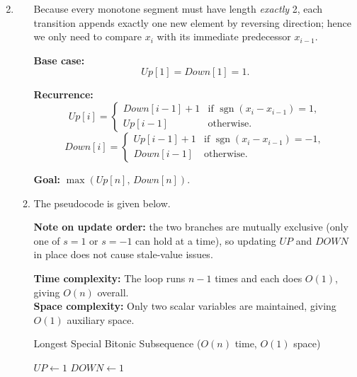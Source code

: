 \documentclass[12pt,a4paper]{article}
\makeatletter
\newtheorem*{solution}{Solution}
\theoremstyle{definition}
\renewenvironment{solution}[1][Solution] {\par\pushQED{\qed}\normalfont\topsep6\p@\@plus6\p@\relax\trivlist\item[\hskip\labelsep\bfseries#1\@addpunct{.}]\ignorespaces}{\popQED\endtrivlist\@endpefalse} \makeatother
\makeatother
\begin{document}
\begin{enumerate}
\begin{solution}
\begin{enumerate}
        Because every monotone segment must have length \emph{exactly}
        2, each transition appends exactly one new element by reversing
        direction; hence we only need to compare $x_i$ with its
        immediate predecessor $x_{i-1}$.

        \textbf{Base case:}
        \[
            Up[1] = Down[1] = 1.
        \]

        \textbf{Recurrence:}
        \[
            Up[i] =
            \begin{cases}
                Down[i-1] + 1 & \text{if } \operatorname{sgn}(x_i - x_{i-1}) = 1, \\
                Up[i-1]       & \text{otherwise.}
            \end{cases}
        \]
        \[
            Down[i] =
            \begin{cases}
                Up[i-1] + 1 & \text{if } \operatorname{sgn}(x_i - x_{i-1}) = -1, \\
                Down[i-1]   & \text{otherwise.}
            \end{cases}
        \]

        \textbf{Goal:} $\max(Up[n],\, Down[n])$.

        \item
        The pseudocode is given below.
        
        \textbf{Note on update order:} the two branches are mutually
        exclusive (only one of $s=1$ or $s=-1$ can hold at a time),
        so updating $UP$ and $DOWN$ in place does not cause stale-value
        issues.

        \textbf{Time complexity:} The loop runs $n-1$ times and each
        does $O(1)$, giving $O(n)$ overall.\\
        \textbf{Space complexity:} Only two scalar variables are
        maintained, giving $O(1)$ auxiliary space.
        
        \begin{minipage}{\linewidth}
        \begin{algorithm}[H]
        \caption{Longest Special Bitonic Subsequence ($O(n)$ time, $O(1)$ space)}
        \label{alg:lsbs}
        $UP   \gets 1$\;
        $DOWN \gets 1$\;
        \;
        \end{algorithm}
        \end{minipage}


\end{enumerate}
\end{solution}
\end{enumerate}
\end{document}

